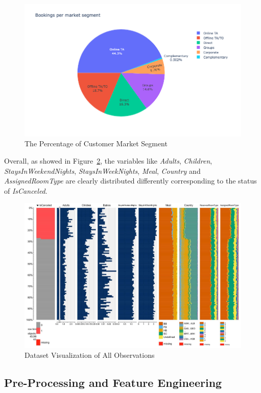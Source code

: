 \documentclass[10pt,twocolumn,letterpaper]{article}
\begin{document}
\begin{figure}[ht]
\begin{center}
    \includegraphics[width=0.8\linewidth]{images/Market_Percentage.png}
\end{center}
   \caption{The Percentage of Customer Market Segment}
\label{fig:MarketPercent}
\end{figure}


Overall, as showed in Figure~\ref{fig:ResortHotel}, the variables like \emph{Adults}, \emph{Children}, \emph{StaysInWeekendNights}, \emph{StaysInWeekNights}, \emph{Meal}, \emph{Country} and \emph{AssignedRoomType} are clearly distributed differently corresponding to the status of \emph{IsCanceled}. 

\begin{figure}
\begin{center}
    \includegraphics[width=0.8\linewidth]{images/Dataset_Resort_Hotel_Visualize.jpg}
\end{center}
   \caption{Dataset Visualization of All Observations}
\label{fig:ResortHotel}
\end{figure}


\subsection{Pre-Processing and Feature Engineering}
\end{document}

